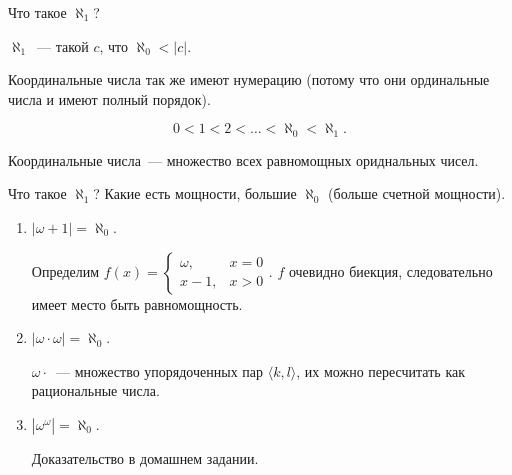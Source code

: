 Что такое $\aleph_1$?
\begin{definition}
    $\aleph_1$~--- такой $c$, что $\aleph_0 < |c|$.
\end{definition}

\begin{note}
    Координальные числа так же имеют нумерацию (потому что они ординальные числа и имеют полный порядок).

    \[ 0 < 1 < 2 < \dots < \aleph_0 < \aleph_1. \]
\end{note}

\begin{definition}

    Координальные числа~--- множество всех равномощных ориднальных чисел.
\end{definition}

Что такое $\aleph_1$? Какие есть мощности, большие $\aleph_0$ (больше счетной мощности).

\begin{example}
    \begin{enumerate}
        \item $|\omega + 1| = \aleph_0$.

        Определим $f(x) = \begin{cases}
            \omega,& x = 0\\
            x - 1, & x > 0
        \end{cases}$. $f$ очевидно биекция, следовательно имеет место быть равномощность.
        \item $|\omega \cdot \omega| = \aleph_0$.

        $\omega \cdot $~--- множество упорядоченных пар $\langle k, l\rangle$, их можно пересчитать как рациональные числа.
        \item $|\omega^\omega| = \aleph_0$.

        Доказательство в домашнем задании.
    \end{enumerate}
\end{example}

